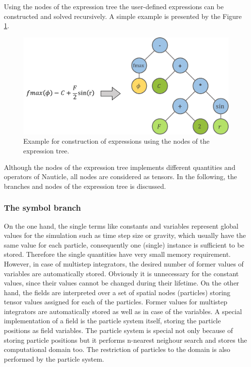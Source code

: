 \documentclass[a4paper,12pt,openany]{book}
\theoremstyle{break}
\begin{document}
Using the nodes of the expression tree the user-defined expressions can be constructed and solved recursively. A simple example is presented by the Figure \ref{fig:expression_example}.
\begin{figure}[h]
  \includegraphics[scale=0.5]{expression_example.pdf}
  \centering
  \caption{Example for construction of expressions using the nodes of the expression tree.}
  \label{fig:expression_example}
\end{figure}\vspace*{3pt}

Although the nodes of the expression tree implements different quantities and operators of Nauticle, all nodes are considered as tensors. In the following, the branches and nodes of the expression tree is discussed.

\subsubsection{The symbol branch}
On the one hand, the single terms like constants and variables represent global values for the simulation such as time step size or gravity, which usually have the same value for each particle, consequently one (single) instance is sufficient to be stored. Therefore the single quantities have very small memory requirement. However, in case of multistep integrators, the desired number of former values of variables are automatically stored. Obviously it is unnecessary for the constant values, since their values cannot be changed during their lifetime. On the other hand, the fields are interpreted over a set of spatial nodes (particles) storing tensor values assigned for each of the particles. Former values for multistep integrators are automatically stored as well as in case of the variables. A special implementation of a field is the particle system itself, storing the particle positions as field variables. The particle system is special not only because of storing particle positions but it performs n-nearest neighour search and stores the computational domain too. The restriction of particles to the domain is also performed by the particle system.
\end{document}
